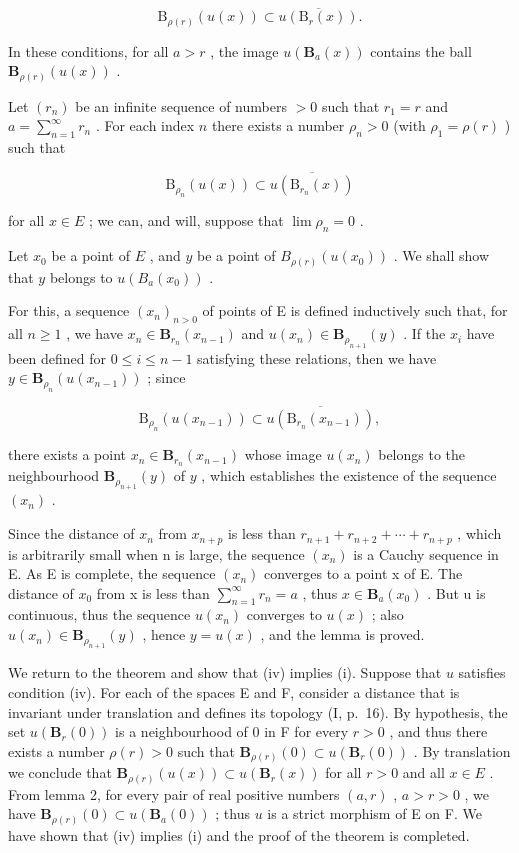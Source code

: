 \[
\mathrm{B} _ {\rho (r)} (u (x)) \subset \overline {{u (\mathrm{B} _ {r} (x))}}.
\]

In these conditions, for all \(a > r\) , the image \(u(\mathbf{B}_a(x))\) contains the ball \(\mathbf{B}_{\rho(r)}(u(x))\) .

Let \((r_n)\) be an infinite sequence of numbers \(>0\) such that \(r_1 = r\) and \(a = \sum_{n=1}^{\infty} r_n\) . For each index \(n\) there exists a number \(\rho_n > 0\) (with \(\rho_1 = \rho(r)\) ) such that

\[
\mathrm{B} _ {\rho_ {n}} (u (x)) \subset \overline {{u (\mathrm{B} _ {r _ {n}} (x))}}
\]

for all \(x \in E\) ; we can, and will, suppose that \(\lim \rho_{n} = 0\) .

Let \(x_0\) be a point of \(E\) , and \(y\) be a point of \(B_{\rho(r)}(u(x_0))\) . We shall show that \(y\) belongs to \(u(B_a(x_0))\) .

For this, a sequence \((x_{n})_{n>0}\) of points of E is defined inductively such that, for all \(n \geqslant 1\) , we have \(x_{n} \in \mathbf{B}_{r_{n}}(x_{n-1})\) and \(u(x_{n}) \in \mathbf{B}_{\rho_{n+1}}(y)\) . If the \(x_{i}\) have been defined for \(0 \leqslant i \leqslant n - 1\) satisfying these relations, then we have \(y \in \mathbf{B}_{\rho_{n}}(u(x_{n-1}))\) ; since

\[
\mathrm{B} _ {\rho_ {n}} (u (x _ {n - 1})) \subset \overline {{u (\mathrm{B} _ {r _ {n}} (x _ {n - 1}))}},
\]

there exists a point \(x_{n} \in \mathbf{B}_{r_n}(x_{n-1})\) whose image \(u(x_{n})\) belongs to the neighbourhood \(\mathbf{B}_{\rho_{n+1}}(y)\) of \(y\) , which establishes the existence of the sequence \((x_{n})\) .

Since the distance of \(x_{n}\) from \(x_{n+p}\) is less than \(r_{n+1} + r_{n+2} + \cdots + r_{n+p}\) , which is arbitrarily small when n is large, the sequence \((x_{n})\) is a Cauchy sequence in E. As E is complete, the sequence \((x_{n})\) converges to a point x of E. The distance of \(x_{0}\) from x is less than \(\sum_{n=1}^{\infty} r_{n} = a\) , thus \(x \in \mathbf{B}_{a}(x_{0})\) . But u is continuous, thus the sequence \(u(x_{n})\) converges to \(u(x)\) ; also \(u(x_{n}) \in \mathbf{B}_{\rho_{n+1}}(y)\) , hence \(y = u(x)\) , and the lemma is proved.

We return to the theorem and show that (iv) implies (i). Suppose that \(u\) satisfies condition (iv). For each of the spaces E and F, consider a distance that is invariant under translation and defines its topology (I, p.~16). By hypothesis, the set \(u(\mathbf{B}_r(0))\) is a neighbourhood of 0 in F for every \(r > 0\) , and thus there exists a number \(\rho(r) > 0\) such that \(\mathbf{B}_{\rho(r)}(0) \subset u(\mathbf{B}_r(0))\) . By translation we conclude that \(\mathbf{B}_{\rho(r)}(u(x)) \subset u(\mathbf{B}_r(x))\) for all \(r > 0\) and all \(x \in E\) . From lemma 2, for every pair of real positive numbers \((a, r)\) , \(a > r > 0\) , we have \(\mathbf{B}_{\rho(r)}(0) \subset u(\mathbf{B}_a(0))\) ; thus \(u\) is a strict morphism of E on F. We have shown that (iv) implies (i) and the proof of the theorem is completed.

